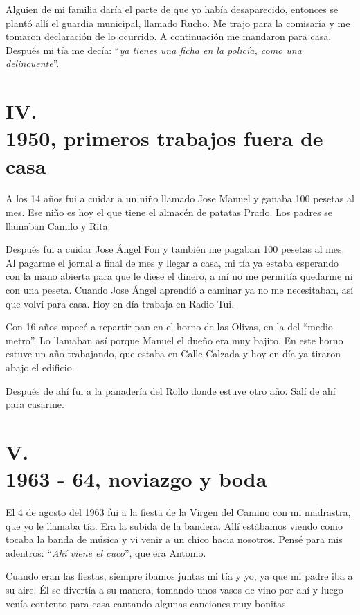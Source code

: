 \documentclass[12pt,a5paper]{book}
\begin{document}
Alguien de mi familia daría el parte de que yo había desaparecido, entonces se plantó allí el guardia municipal, llamado Rucho. Me trajo para la comisaría y me tomaron declaración de lo ocurrido. A continuación me mandaron para casa. Después mi tía me decía: ``\textit{ya tienes una ficha en la policía, como una delincuente}''.



\section*{IV.\\1950, primeros trabajos fuera de casa}

A los 14 años fui a cuidar a un niño llamado Jose Manuel y ganaba 100 pesetas al mes. Ese niño es hoy el que tiene el almacén de patatas Prado. Los padres se llamaban Camilo y Rita. 

Después fui a cuidar Jose Ángel Fon y también me pagaban 100 pesetas al mes. Al pagarme el jornal a final de mes y llegar a casa, mi tía ya estaba esperando con la mano abierta para que le diese el dinero, a mí no me permitía quedarme ni con una peseta. Cuando Jose Ángel aprendió a caminar ya no me necesitaban, así que volví para casa. Hoy en día trabaja en Radio Tui.

Con 16 años mpecé a repartir pan en el horno de las Olivas, en la del ``medio metro''. Lo llamaban así porque Manuel el dueño era muy bajito. En este horno estuve un año trabajando, que estaba en Calle Calzada y hoy en día ya tiraron abajo el edificio.

Después de ahí fui a la panadería del Rollo donde estuve otro año. Salí de ahí para casarme.


\section*{V.\\1963 - 64, noviazgo y boda}


El 4 de agosto del 1963 fui a la fiesta de la Virgen del Camino con mi madrastra, que yo le llamaba tía. Era la subida de la bandera. Allí estábamos viendo como tocaba la banda de música y vi venir a un chico hacia nosotros. Pensé para mis adentros: ``\textit{Ahí viene el cuco}'', que era Antonio.

Cuando eran las fiestas, siempre íbamos juntas mi tía y yo, ya que mi padre iba a su aire. Él se divertía a su manera, tomando unos vasos de vino por ahí y luego venía contento para casa cantando algunas canciones muy bonitas.
\end{document}
